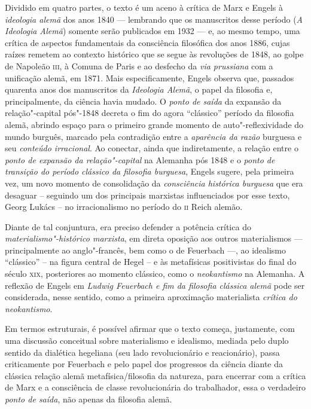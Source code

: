 Dividido em quatro partes, o texto é um aceno à
crítica de Marx e Engels à \emph{ideologia alemã} dos anos 1840 ---
lembrando que os manuscritos desse período (\emph{A Ideologia
Alemã}) somente serão publicados em 1932 --- e, ao mesmo tempo, uma crítica de aspectos
fundamentais da consciência filosófica dos anos 1886, cujas raízes remetem ao contexto histórico que se segue às
revoluções de 1848, ao golpe de Napoleão \textsc{iii}, à Comuna de Paris e
ao desfecho da \emph{via prussiana} com a unificação alemã, em 1871. Mais especificamente, Engels observa que, passados quarenta anos dos manuscritos da \emph{Ideologia Alemã}, o
papel da filosofia e, principalmente, da ciência havia mudado. O
\emph{ponto de saída} da expansão da relação"-capital pós"-1848 decreta o
fim do agora ``clássico'' período da filosofia alemã, abrindo espaço para
o primeiro grande momento de auto"-reflexividade do mundo burguês, marcado pela contradição entre a 
\emph{aparência da razão} burguesa e seu \emph{conteúdo irracional}. Ao
conectar, ainda que indiretamente, a relação entre o \emph{ponto de
expansão da relação"-capital} na Alemanha pós 1848 e o \emph{ponto de
transição do período clássico da filosofia burguesa}, Engels sugere,
pela primeira vez, um novo momento de consolidação da \emph{consciência
histórica burguesa} que era desaguar -- seguindo um dos principais
marxistas influenciados por esse texto, Georg Lukács -- no irracionalismo
no período do \textsc{ii} Reich alemão.

Diante de tal conjuntura, era preciso defender a potência crítica do
\emph{materialismo"-histórico marxista}, em direta oposição aos outros
materialismos --- principalmente ao anglo"-francês, bem como o de Feuerbach ---, ao
idealismo ``clássico'' -- na figura central de Hegel -- e às metafísicas
positivistas do final do século \textsc{xix}, posteriores ao momento clássico,
como o \emph{neokantismo} na Alemanha. A reflexão de Engels em \emph{Ludwig Feuerbach e fim da filosofia clássica alemã} pode ser
considerada, nesse sentido, como a primeira aproximação materialista
\emph{crítica do neokantismo}.

Em termos estruturais, é possível afirmar que o texto começa, justamente,
com uma discussão conceitual sobre materialismo e idealismo, mediada
pelo duplo sentido da dialética hegeliana (seu lado revolucionário
e reacionário), passa criticamente por Feuerbach e pelo papel dos
progressos da ciência diante da clássica relação alemã
metafísica/filosofia da natureza, para encerrar com a crítica de Marx
e a consciência de classe revolucionária do trabalhador, essa o
verdadeiro \emph{ponto de saída}, não apenas da filosofia alemã.

